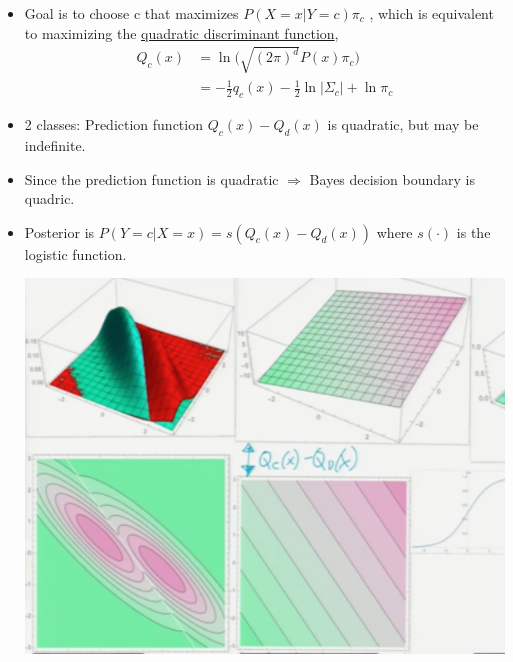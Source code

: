 \documentclass[10pt]{article}
\begin{document}
\begin{itemize}
\begin{itemize}
						\item Goal is to choose c that maximizes $P(X=x|Y=c)\pi_{c}$ , which is equivalent to maximizing the \underline{quadratic discriminant function},
							\begin{align*}
								Q_{c}(x) &= \ln \Big(\sqrt{(2\pi)^{d}}P(x)\pi_{c}\Big)\\
										&= -\frac{1}{2}q_{c}(x)-\frac{1}{2} \ln |\Sigma_{c}| + \ln \pi_{c}
							\end{align*}
						\item 2 classes: Prediction function $Q_{c}(x) - Q_{d}(x)$ is quadratic, but may be indefinite.
						\item Since the prediction function is quadratic $\Rightarrow$ Bayes decision boundary is quadric.
						\item Posterior is $P(Y=c|X=x) = s(Q_{c}(x) - Q_{d}(x))$ where $s(\cdot)$ is the logistic function.
							\begin{center}
								\includegraphics[scale=0.5]{../images/LDA}
							\end{center} 
					\end{itemize}
				

\end{itemize}
\end{document}
